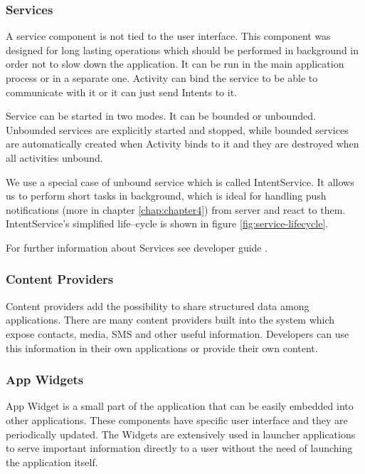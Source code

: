 

\subsubsection{Services}
A service component is not tied to the user interface. This component was designed for long lasting operations which should be performed in background in order not to slow down the application. It can be run in the main application process or in a separate one. Activity can bind the service to be able to communicate with it or it can just send Intents to it.

Service can be started in two modes. It can be bounded or unbounded. Unbounded services are explicitly started and stopped, while bounded services are automatically created when Activity binds to it and they are destroyed when all activities unbound. 

We use a special case of unbound service which is called IntentService. It allows us to perform short tasks in background,  which is ideal for handling push notifications (more in chapter \ref{chap:chapter4}) from server and react to them. IntentService's simplified life--cycle is shown in figure \ref{fig:service-lifecycle}.


For further information about Services see developer guide \cite{service-lifecycle}.


\subsubsection{Content Providers}
Content providers add the possibility to share structured data among applications. There are many content providers built into the system which expose contacts, media, SMS and other useful information. Developers can use this information in their own applications or  provide their own content.

\subsubsection{App Widgets}
App Widget is a small part of the application that can be easily embedded into other applications. These components have specific user interface and they are periodically updated. The Widgets are extensively used in launcher applications to serve important information directly to a user without the need of launching the application itself.

